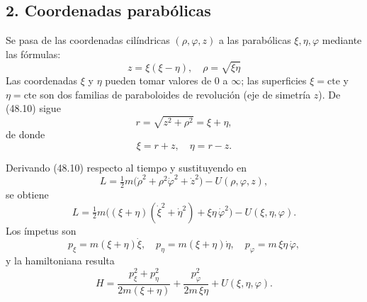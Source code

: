 \documentclass[12pt]{article}
\begin{document}
\subsection*{2. Coordenadas parabólicas}

Se pasa de las coordenadas cilíndricas \((\rho,\varphi,z)\) a las parabólicas \(\xi,\eta,\varphi\) mediante las fórmulas:
\begin{equation}
z = \xi(\xi - \eta),\quad
\rho = \sqrt{\xi\eta}
\tag{48.10}
\end{equation}
Las coordenadas \(\xi\) y \(\eta\) pueden tomar valores de \(0\) a \(\infty\); las superficies \(\xi=\text{cte}\) y \(\eta=\text{cte}\) son dos familias de paraboloides de revolución (eje de simetría \(z\)). De (48.10) sigue
\begin{equation}
r=\sqrt{z^2+\rho^2}=\xi+\eta,
\tag{48.11}
\end{equation}
de donde
\begin{equation}
\xi = r+z,\quad
\eta = r - z.
\tag{48.12}
\end{equation}

Derivando (48.10) respecto al tiempo y sustituyendo en
\[
L = \tfrac12 m\bigl(\dot\rho^2 + \rho^2\dot\varphi^2 + \dot z^2\bigr)-U(\rho,\varphi,z),
\]
se obtiene
\begin{equation}
L = \tfrac12 m\bigl((\xi+\eta)(\dot\xi^2+\dot\eta^2)+\xi\eta\,\dot\varphi^2\bigr)-U(\xi,\eta,\varphi).
\tag{48.13}
\end{equation}
Los ímpetus son
\[
p_\xi = m(\xi+\eta)\dot\xi,\quad
p_\eta = m(\xi+\eta)\dot\eta,\quad
p_\varphi = m\,\xi\eta\,\dot\varphi,
\]
y la hamiltoniana resulta
\begin{equation}
H = \frac{p_\xi^2+p_\eta^2}{2m(\xi+\eta)}
+\frac{p_\varphi^2}{2m\,\xi\eta}
+U(\xi,\eta,\varphi).
\tag{48.14}
\end{equation}
\end{document}
